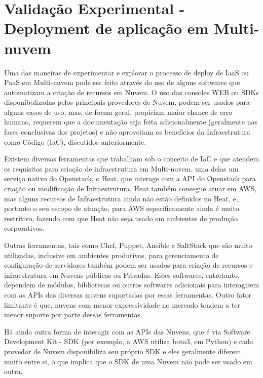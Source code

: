 \documentclass[12pt]{article}
\begin{document}
	\section{Validação Experimental - Deployment de aplicação em Multi-nuvem}
	
	Uma das maneiras de experimentar e explorar o processo de deploy de IaaS ou PaaS em Multi-nuvem pode ser feito através do uso de alguns softwares que automatizam a criação de recursos em Nuvem. O uso das consoles WEB ou SDKs disponibolizadas pelos principais provedores de Nuvem, podem ser usados para alguns casos de uso, mas, de forma geral,  propiciam maior chance de erro humano, requerem que a documentação seja feita adicionalmente (geralmente nas fases conclusivas dos projetos) e não aproveitam os benefícios da Infraestrutura como Código (IaC), discutidos anteriormente.
	
	Existem diversas ferramentas que trabalham sob o conceito de IaC e que atendem os requisitos para criação de infraestrutura em Multi-nuvem, uma delas um serviço nativo do Openstack, o Heat, que interage com a API do Openstack para criação ou modificação de Infraestrutura. Heat também consegue atuar em AWS, mas alguns recursos de Infraestrutura ainda não estão definidos no Heat, e, portanto o seu escopo de atuação, para AWS especificamente ainda é muito restritivo, fazendo com que Heat não seja usado em ambientes de produção corporativos. 
	
	Outras ferramentas, tais como Chef, Puppet, Ansible e SaltStack que são muito utilizadas, inclusive em ambientes produtivos, para gerenciamento de configuração de servidores também podem ser usados para criação de recursos e infraestrutura em Nuvens públicas ou Privadas. Estes softwares, entretanto, dependem de módulos, bibliotecas ou outros softwares adicionais para interagirem com as APIs das diversas nuvens suportadas por essas ferramentas. Outro fator limitante é que, nuvens com menor expressividade no mercado tendem a ter menor suporte por parte dessas ferramentas.
	
	Há ainda outra forma de interagir com as APIs das Nuvens, que é via Software Development Kit - SDK (por exemplo, a AWS utiliza boto3, em Python) e cada provedor de Nuvem disponibiliza seu próprio SDK e eles geralmente diferem muito entre si, o que implica que o SDK de uma Nuvem não pode ser usado em outra.
	
\end{document}
